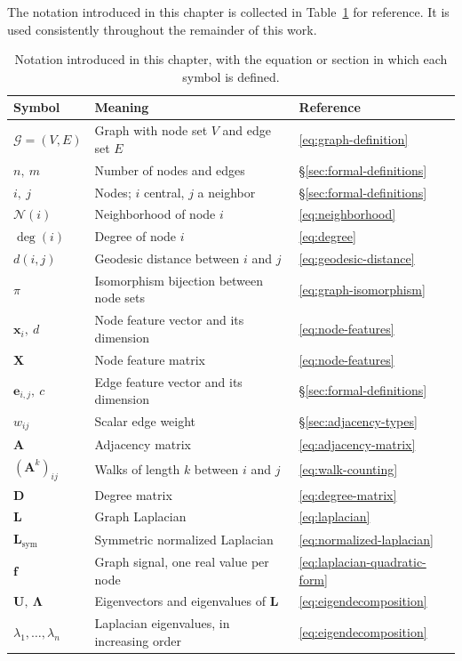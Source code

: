 The notation introduced in this chapter is collected in
Table~\ref{tab:notation} for reference. It is used consistently throughout
the remainder of this work.

\begin{table}
  \centering
  \caption[Notation summary introduced in Chapter 3.]{%
    Notation introduced in this chapter, with the equation or section in
    which each symbol is defined.
  }
  \label{tab:notation}
  \begin{tabular}{@{}lll@{}}
    \toprule
    Symbol & Meaning & Reference \\
    \midrule
    $\mathcal{G} = (V, E)$ & Graph with node set $V$ and edge set $E$
      & \eqref{eq:graph-definition} \\
    $n,\ m$ & Number of nodes and edges
      & \S\ref{sec:formal-definitions} \\
    $i,\ j$ & Nodes; $i$ central, $j$ a neighbor
      & \S\ref{sec:formal-definitions} \\
    $\mathcal{N}(i)$ & Neighborhood of node $i$
      & \eqref{eq:neighborhood} \\
    $\deg(i)$ & Degree of node $i$
      & \eqref{eq:degree} \\
    $d(i, j)$ & Geodesic distance between $i$ and $j$
      & \eqref{eq:geodesic-distance} \\
    $\pi$ & Isomorphism bijection between node sets
      & \eqref{eq:graph-isomorphism} \\
    \midrule
    $\mathbf{x}_i,\ d$ & Node feature vector and its dimension
      & \eqref{eq:node-features} \\
    $\mathbf{X}$ & Node feature matrix
      & \eqref{eq:node-features} \\
    $\mathbf{e}_{i,j},\ c$ & Edge feature vector and its dimension
      & \S\ref{sec:formal-definitions} \\
    $w_{ij}$ & Scalar edge weight
      & \S\ref{sec:adjacency-types} \\
    \midrule
    $\mathbf{A}$ & Adjacency matrix
      & \eqref{eq:adjacency-matrix} \\
    $(\mathbf{A}^k)_{ij}$ & Walks of length $k$ between $i$ and $j$
      & \eqref{eq:walk-counting} \\
    $\mathbf{D}$ & Degree matrix
      & \eqref{eq:degree-matrix} \\
    $\mathbf{L}$ & Graph Laplacian
      & \eqref{eq:laplacian} \\
    $\mathbf{L}_{\mathrm{sym}}$ & Symmetric normalized Laplacian
      & \eqref{eq:normalized-laplacian} \\
    \midrule
    $\mathbf{f}$ & Graph signal, one real value per node
      & \eqref{eq:laplacian-quadratic-form} \\
    $\mathbf{U},\ \boldsymbol{\Lambda}$ & Eigenvectors and eigenvalues of
      $\mathbf{L}$ & \eqref{eq:eigendecomposition} \\
    $\lambda_1, \ldots, \lambda_n$ & Laplacian eigenvalues, in increasing
      order & \eqref{eq:eigendecomposition} \\
    \bottomrule
  \end{tabular}
\end{table}
